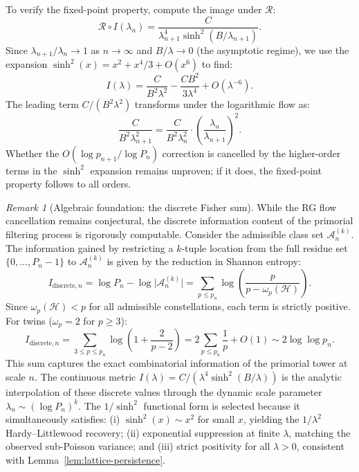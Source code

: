 \documentclass[11pt]{article}
\theoremstyle{remark}
\newtheorem{remark}[theorem]{Remark}
\begin{document}
To verify the fixed-point property, compute the image under $\mathcal{R}$:
\begin{equation}
\mathcal{R} \circ I(\lambda_n) = \frac{C}{\lambda_{n+1}^4 \sinh^2(B/\lambda_{n+1})}.
\end{equation}
Since $\lambda_{n+1}/\lambda_n \to 1$ as $n \to \infty$
and $B/\lambda \to 0$ (the asymptotic regime), we use the expansion
$\sinh^2(x) = x^2 + x^4/3 + O(x^6)$ to find:
\begin{equation}
I(\lambda) = \frac{C}{B^2 \lambda^2} - \frac{CB^2}{3\lambda^4} + O(\lambda^{-6}).
\end{equation}
The leading term $C/(B^2 \lambda^2)$ transforms under the logarithmic
flow as:
\begin{equation}
\frac{C}{B^2 \lambda_{n+1}^2} = \frac{C}{B^2 \lambda_n^2} \cdot
\left(\frac{\lambda_n}{\lambda_{n+1}}\right)^2.
\end{equation}
Whether the $O(\log p_{n+1}/\log P_n)$ correction is cancelled by the
higher-order terms in the $\sinh^2$ expansion remains unproven; if it
does, the fixed-point property follows to all orders.

\begin{remark}[Algebraic foundation: the discrete Fisher sum]
While the RG flow cancellation remains conjectural, the discrete
information content of the primorial filtering process is rigorously
computable. Consider the admissible class set $\mathcal{A}_n^{(k)}$.
The information gained by restricting a $k$-tuple location from the
full residue set $\{0, \ldots, P_n-1\}$ to $\mathcal{A}_n^{(k)}$ is
given by the reduction in Shannon entropy:
\begin{equation}
I_{\text{discrete}, n} = \log P_n - \log \bigl|\mathcal{A}_n^{(k)}\bigr|
= \sum_{p \leq p_n} \log\!\left(\frac{p}{p - \omega_p(\mathcal{H})}\right).
\end{equation}
Since $\omega_p(\mathcal{H}) < p$ for all admissible constellations,
each term is strictly positive. For twins ($\omega_p=2$ for $p \geq 3$):
\begin{equation}
I_{\text{discrete}, n} = \sum_{3 \leq p \leq p_n} \log\!\left(1 + \frac{2}{p-2}\right)
= 2 \sum_{p \leq p_n} \frac{1}{p} + O(1) \sim 2 \log \log p_n.
\end{equation}
This sum captures the exact combinatorial information of the primorial
tower at scale $n$. The continuous metric $I(\lambda) = C/(\lambda^4
\sinh^2(B/\lambda))$ is the analytic interpolation of these discrete
values through the dynamic scale parameter $\lambda_n \sim (\log
P_n)^k$. The $1/\sinh^2$ functional form is selected because it
simultaneously satisfies: (i) $\sinh^2(x) \sim x^2$ for small $x$,
yielding the $1/\lambda^2$ Hardy--Littlewood recovery; (ii) exponential
suppression at finite $\lambda$, matching the observed sub-Poisson
variance; and (iii) strict positivity for all $\lambda > 0$, consistent
with Lemma~\ref{lem:lattice-persistence}.
\end{remark}
\end{document}
